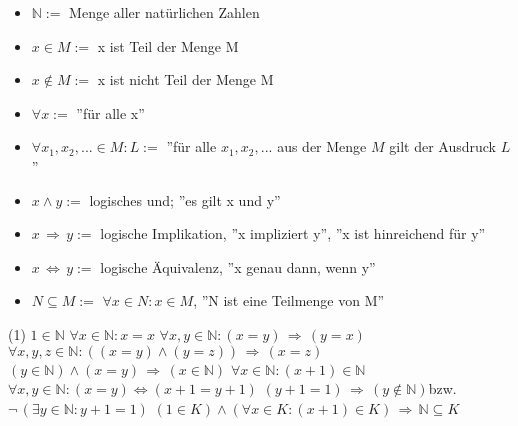 \documentclass[a4paper,graphics,11pt]{article}
\begin{document}
\begin{itemize}
    \item[] $\mathbb{N} :=$ Menge aller natürlichen Zahlen
    \item[] $x \in M :=$ x ist Teil der Menge M
    \item[] $x \notin M :=$ x ist nicht Teil der Menge M
    \item[] $\forall x :=$ ''für alle x''
    \item[] $\forall x_{1},x_{2},... \in M: L :=$ ''für alle $x_{1},x_{2},...$ aus der
        Menge $M$ gilt der Ausdruck $L$''
    \item[] $x \land y:=$ logisches und; ''es gilt x und y''
    \item[] $x\,\Rightarrow\,y:=$ logische Implikation, ''x impliziert y'', ''x ist hinreichend für y''
    \item[] $x\,\Leftrightarrow\,y:=$ logische Äquivalenz, ''x genau dann, wenn y''
    \item[] $N \subseteq M:=$ $\forall x \in N: x \in M$, ''N ist eine Teilmenge von M''
\end{itemize}



\begin{tasks}(1)
    \task $1 \in \mathbb{N}$
    \task $\forall x \in \mathbb{N}: x=x$
    \task $\forall x,y \in \mathbb{N}: (x=y) \,\Rightarrow\, (y=x)$
    \task $\forall x,y,z \in \mathbb{N}: ((x=y) \land (y=z)) \,\Rightarrow\, (x=z)$
    \task $(y \in \mathbb{N}) \land (x=y) \,\Rightarrow\, (x \in \mathbb{N})$ 
    \task $\forall x \in \mathbb{N}: (x+1) \in \mathbb{N}$
    \task $\forall x,y \in \mathbb{N}: (x=y) \Leftrightarrow (x+1=y+1)$
    \task $(y+1=1) \,\Rightarrow\, (y \notin \mathbb{N})$\qquad bzw.\qquad $\lnot\,(\exists y \in \mathbb{N}: y+1=1)$
    \task $(1 \in K) \land (\forall x \in K: (x+1) \in K) \,\Rightarrow\, \mathbb{N} \subseteq K$
\end{tasks}
\end{document}
